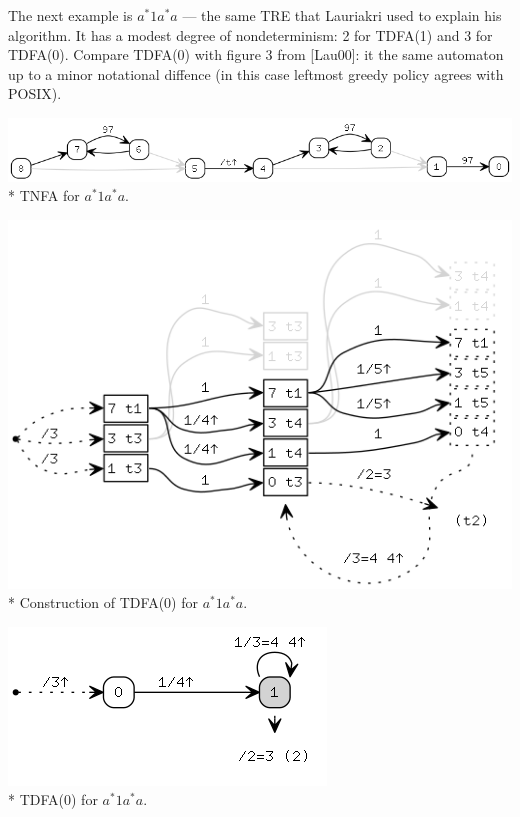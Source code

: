 \documentclass{article}
\theoremstyle{definition}
\begin{document}
\begin{multicols}{2}
The next example is $a^* 1 a^* a$ --- the same TRE that Lauriakri used to explain his algorithm.
It has a modest degree of nondeterminism: 2 for TDFA(1) and 3 for TDFA(0).
Compare TDFA(0) with figure 3 from [Lau00]: it the same automaton up to a minor notational diffence
(in this case leftmost greedy policy agrees with POSIX).
\begin{center}
\includegraphics[width=\linewidth]{img/example2/tnfa.png}\\*
\footnotesize{TNFA for $a^* 1 a^* a$.} \\
\end{center}
\begin{center}
\includegraphics[width=0.8\linewidth]{img/example2/tdfa0_raw.png}\\*
\footnotesize{Construction of TDFA(0) for $a^* 1 a^* a$.} \\
\end{center}
\begin{center}
\includegraphics[width=0.55\linewidth]{img/example2/tdfa0.png}\\*
\footnotesize{TDFA(0) for $a^* 1 a^* a$.} \\
\end{center}
\begin{center}

\end{center}
\end{multicols}
\end{document}
